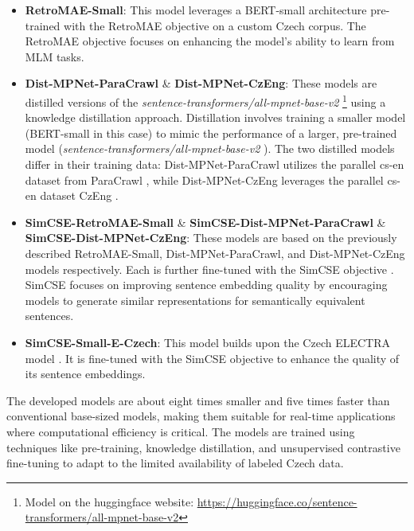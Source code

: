 \begin{itemize}
  \item \textbf{RetroMAE-Small}:
    This model leverages a \ac{BERT}-small architecture pre-trained with the \ac{RetroMAE} objective \cite{xiao2022retromae} on a custom Czech corpus.
    The \ac{RetroMAE} objective focuses on enhancing the model's ability to learn from \ac{MLM} tasks.
  \item \textbf{Dist-MPNet-ParaCrawl} \& \textbf{Dist-MPNet-CzEng}:
    These models are distilled versions of the \textit{sentence-transformers/all-mpnet-base-v2} \footnote{\label{hf_all-mpnet-base-v2} Model on the huggingface website: \url{https://huggingface.co/sentence-transformers/all-mpnet-base-v2}} using a knowledge distillation approach.
    Distillation involves training a smaller model (\ac{BERT}-small in this case) to mimic the performance of a larger, pre-trained model (\textit{sentence-transformers/all-mpnet-base-v2} ).
    The two distilled models differ in their training data: Dist-MPNet-ParaCrawl utilizes the parallel cs-en dataset from ParaCrawl \cite{espla2019paracrawl}, while Dist-MPNet-CzEng leverages the parallel cs-en dataset CzEng \cite{kocmi2020announcing}.
  \item \textbf{SimCSE-RetroMAE-Small} \& \textbf{SimCSE-Dist-MPNet-ParaCrawl} \& \textbf{SimCSE-Dist-MPNet-CzEng}:
    These models are based on the previously described RetroMAE-Small, Dist-MPNet-ParaCrawl, and Dist-MPNet-CzEng models respectively.
    Each is further fine-tuned with the \ac{SimCSE} objective \cite{gao2022simcse}.
    \ac{SimCSE} focuses on improving sentence embedding quality by encouraging models to generate similar representations for semantically equivalent sentences.
  \item \textbf{SimCSE-Small-E-Czech}:
    This model builds upon the Czech ELECTRA model \cite{kocián2021siamese}.
    It is fine-tuned with the \ac{SimCSE} \cite{gao2022simcse} objective to enhance the quality of its sentence embeddings.    
\end{itemize}

The developed models are about eight times smaller and five times faster than conventional base-sized models, making them suitable for real-time applications where computational efficiency is critical.
The models are trained using techniques like pre-training, knowledge distillation, and unsupervised contrastive fine-tuning to adapt to the limited availability of labeled Czech data.


